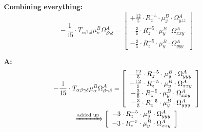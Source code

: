 \documentclass{article}
\begin{document}
\textbf{Combining everything:}
\begin{equation}
- \frac{1}{15} \cdot T_{\alpha{}\beta{}\gamma{}\delta{}} \mu{}^{B}_{\alpha{}} \Omega{}^{A}_{\beta{}\gamma{}\delta{}} =  \left[ \begin{array}{c} 
 		+ \frac{12}{5} \cdot R_{z}^{-5} \cdot \mu{}^{B}_{y} \cdot \Omega{}^{A}_{yzz} 
 \\[0.2em] 		 - \frac{3}{5} \cdot R_{z}^{-5} \cdot \mu{}^{B}_{y} \cdot \Omega{}^{A}_{xxy} 
 \\[0.2em] 		 - \frac{3}{5} \cdot R_{z}^{-5} \cdot \mu{}^{B}_{y} \cdot \Omega{}^{A}_{yyy}
 \end{array}\right] 
\end{equation}


\textbf{A:}
\begin{subequations}\begin{gather}
- \frac{1}{15} \cdot T_{\alpha{}\beta{}\gamma{}\delta{}} \mu{}^{B}_{\alpha{}} \Omega{}^{A}_{\beta{}\gamma{}\delta{}} =  \left[ \begin{array}{c} 
 		- \frac{12}{5} \cdot R_{z}^{-5} \cdot \mu{}^{B}_{y} \cdot \Omega{}^{A}_{yyy} 
 \\[0.2em] 		 - \frac{12}{5} \cdot R_{z}^{-5} \cdot \mu{}^{B}_{y} \cdot \Omega{}^{A}_{xxy} 
 \\[0.2em] 		 - \frac{3}{5} \cdot R_{z}^{-5} \cdot \mu{}^{B}_{y} \cdot \Omega{}^{A}_{xxy} 
 \\[0.2em] 		 - \frac{3}{5} \cdot R_{z}^{-5} \cdot \mu{}^{B}_{y} \cdot \Omega{}^{A}_{yyy}
 \end{array}\right] 
\\ \xRightarrow{\text{added up}}
  \left[ \begin{array}{c} 
 		- 3 \cdot R_{z}^{-5} \cdot \mu{}^{B}_{y} \cdot \Omega{}^{A}_{yyy} 
 \\[0.2em] 		 - 3 \cdot R_{z}^{-5} \cdot \mu{}^{B}_{y} \cdot \Omega{}^{A}_{xxy}
 \end{array}\right] 
\end{gather}\end{subequations}
\end{document}
